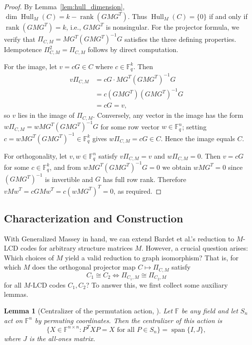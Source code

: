\documentclass[11pt]{article}
\newcommand{\FF}{\mathbb{F}}
\newcommand{\0}{\mathbf{0}}
\newcommand{\1}{\mathbf{1}}
\DeclareMathOperator{\Hull}{Hull}
\DeclareMathOperator{\rank}{rank}
\theoremstyle{plain}
\newtheorem{lemma}[theorem]{Lemma}
\theoremstyle{definition}
\theoremstyle{remark}
\begin{document}
\begin{proof}
By Lemma~\ref{lem:hull_dimension}, $\dim \Hull_M(C) = k - \rank(GMG^T)$. Thus $\Hull_M(C) = \{0\}$ if and only if $\rank(GMG^T) = k$, i.e., $GMG^T$ is nonsingular.
For the projector formula, we verify that $\Pi_{C,M} = MG^T(GMG^T)^{-1}G$ satisfies the three defining properties. Idempotence $\Pi_{C,M}^2 = \Pi_{C,M}$ follows by direct computation.

For the image, let $v = cG \in C$ where $c \in \mathbb{F}_q^k$.
Then
\begin{align*}
v\Pi_{C,M}
&= cG \cdot MG^T(GMG^T)^{-1}G\\
&= c(GMG^T)(GMG^T)^{-1}G\\
&= cG = v,
\end{align*}
so $v$ lies in the image of $\Pi_{C,M}$. Conversely, any vector in the image has the form $w\Pi_{C,M} = wMG^T(GMG^T)^{-1}G$ for some row vector $w \in \mathbb{F}_q^n$; setting $c = wMG^T(GMG^T)^{-1} \in \mathbb{F}_q^k$ gives $w\Pi_{C,M} = cG \in C$. Hence the image equals $C$.

For orthogonality, let $v, w \in \mathbb{F}_q^n$ satisfy $v\Pi_{C,M} = v$ and $w\Pi_{C,M} = 0$. Then $v = cG$ for some $c \in \mathbb{F}_q^k$, and from $wMG^T(GMG^T)^{-1}G = 0$ we obtain $wMG^T = 0$ since $(GMG^T)^{-1}$ is invertible and $G$ has full row rank. Therefore $vMw^T = cGMw^T = c(wMG^T)^T = 0$, as required.
\end{proof}

\subsection{Characterization and Construction}

With Generalized Massey in hand, we can extend Bardet et al.'s reduction to $M$-LCD codes for arbitrary structure matrices $M$. However, a crucial question arises: Which choices of $M$ yield a valid reduction to graph isomorphism? That is, for which $M$ does the orthogonal projector map $C \mapsto \Pi_{C,M}$ satisfy
\[
C_1 \cong C_2 \iff \Pi_{C_1,M} \cong \Pi_{C_2,M}
\]
for all $M$-LCD codes $C_1, C_2$?
To answer this, we first collect some auxiliary lemmas.

\begin{lemma}[Centralizer of the permutation action, \cite{ishizuka2025ccsposter}]
\label{lem:centralizer}
Let $\FF$ be any field and let $S_n$ act on $\FF^n$ by permuting coordinates. Then the centralizer of this action is
\[
\{X \in \FF^{n \times n} : P^T X P = X \text{ for all } P \in S_n\} = \operatorname{span}\{I, J\},
\]
where $J$ is the all-ones matrix.
\end{lemma}
\end{document}
